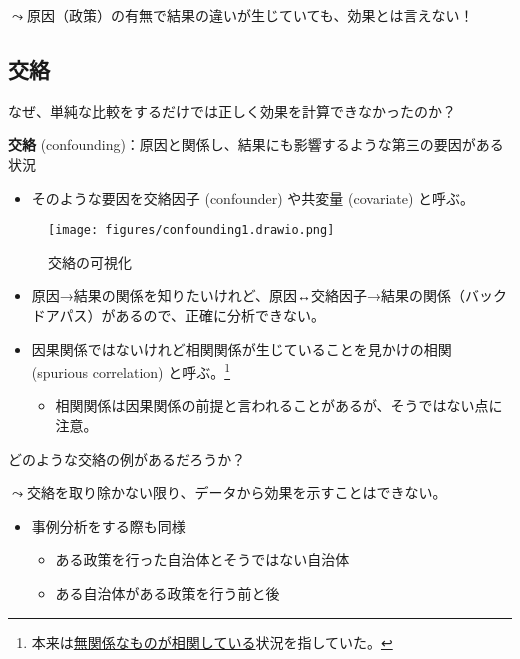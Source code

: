 \documentclass[
  xelatex,
  ja=standard]{bxjsarticle}
\providecommand{\tightlist}{%
  \setlength{\itemsep}{0pt}\setlength{\parskip}{0pt}}\usepackage{longtable,booktabs,array}
\begin{document}
\(\leadsto\)原因（政策）の有無で結果の違いが生じていても、効果とは言えない！

\hypertarget{ux4ea4ux7d61-1}{%
\subsection{交絡}\label{ux4ea4ux7d61-1}}

なぜ、単純な比較をするだけでは正しく効果を計算できなかったのか？

\textbf{交絡}
(confounding)：原因と関係し、結果にも影響するような第三の要因がある状況

\begin{itemize}
\tightlist
\item
  そのような要因を交絡因子 (confounder) や共変量 (covariate) と呼ぶ。
\end{itemize}

\begin{figure}[htpb]

{\centering \texttt{[image: figures/confounding1.drawio.png]}

}

\caption{交絡の可視化}

\end{figure}

\begin{itemize}
\tightlist
\item
  原因→結果の関係を知りたいけれど、原因↔交絡因子→結果の関係（バックドアパス）があるので、正確に分析できない。
\item
  因果関係ではないけれど相関関係が生じていることを見かけの相関 (spurious
  correlation) と呼ぶ。\footnote{本来は\href{https://www.tylervigen.com/spurious-correlations}{無関係なものが相関している}状況を指していた。}

  \begin{itemize}
  \tightlist
  \item
    相関関係は因果関係の前提と言われることがあるが、そうではない点に注意。
  \end{itemize}
\end{itemize}

どのような交絡の例があるだろうか？

\(\leadsto\)交絡を取り除かない限り、データから効果を示すことはできない。

\begin{itemize}
\tightlist
\item
  事例分析をする際も同様

  \begin{itemize}
  \tightlist
  \item
    ある政策を行った自治体とそうではない自治体
  \item
    ある自治体がある政策を行う前と後
  \end{itemize}
\end{itemize}
\end{document}
